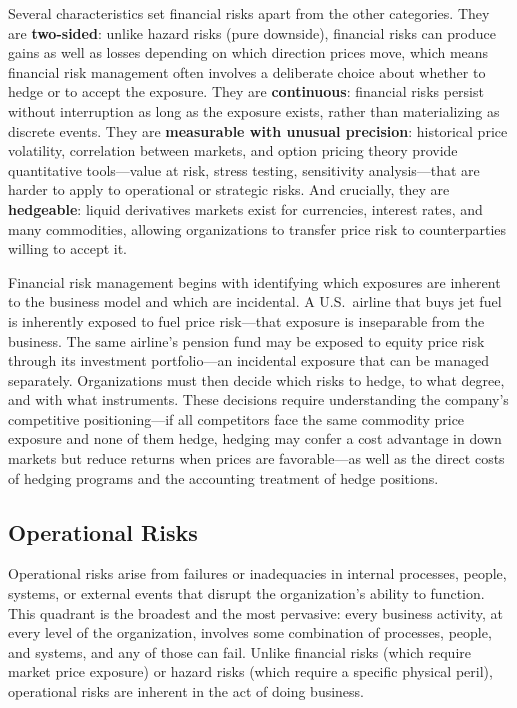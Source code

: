 \documentclass[11pt,openany]{book}
\begin{document}
Several characteristics set financial risks apart from the other categories. They are \textbf{two-sided}: unlike hazard risks (pure downside), financial risks can produce gains as well as losses depending on which direction prices move, which means financial risk management often involves a deliberate choice about whether to hedge or to accept the exposure. They are \textbf{continuous}: financial risks persist without interruption as long as the exposure exists, rather than materializing as discrete events. They are \textbf{measurable with unusual precision}: historical price volatility, correlation between markets, and option pricing theory provide quantitative tools---value at risk, stress testing, sensitivity analysis---that are harder to apply to operational or strategic risks. And crucially, they are \textbf{hedgeable}: liquid derivatives markets exist for currencies, interest rates, and many commodities, allowing organizations to transfer price risk to counterparties willing to accept it.

Financial risk management begins with identifying which exposures are inherent to the business model and which are incidental. A U.S.\ airline that buys jet fuel is inherently exposed to fuel price risk---that exposure is inseparable from the business. The same airline's pension fund may be exposed to equity price risk through its investment portfolio---an incidental exposure that can be managed separately. Organizations must then decide which risks to hedge, to what degree, and with what instruments. These decisions require understanding the company's competitive positioning---if all competitors face the same commodity price exposure and none of them hedge, hedging may confer a cost advantage in down markets but reduce returns when prices are favorable---as well as the direct costs of hedging programs and the accounting treatment of hedge positions.

\subsection{Operational Risks}
\label{subsec:operational-risks}

Operational risks arise from failures or inadequacies in internal processes, people, systems, or external events that disrupt the organization's ability to function. This quadrant is the broadest and the most pervasive: every business activity, at every level of the organization, involves some combination of processes, people, and systems, and any of those can fail. Unlike financial risks (which require market price exposure) or hazard risks (which require a specific physical peril), operational risks are inherent in the act of doing business.
\end{document}
